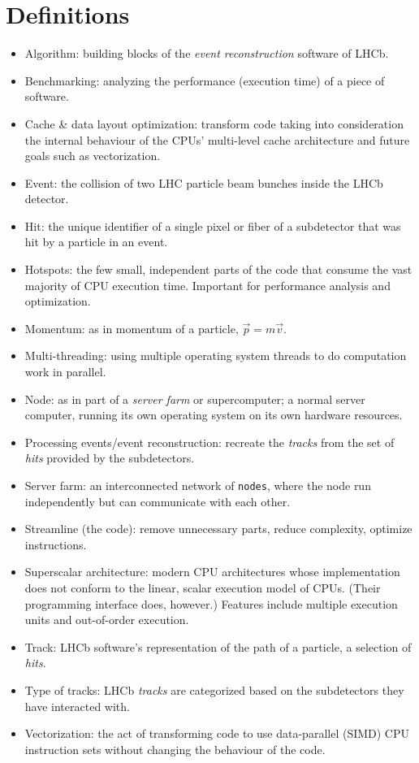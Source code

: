\documentclass[12pt]{article}
\newcommand{\code}[1]{\texttt{#1}}
\begin{document}
\section*{Definitions}

\begin{itemize}
	\item Algorithm: building blocks of the \textit{event reconstruction} software of LHCb.
	\item Benchmarking: analyzing the performance (execution time) of a piece of software.
	\item Cache \& data layout optimization: transform code taking into consideration the internal behaviour of the CPUs' multi-level cache architecture and future goals such as vectorization.
	\item Event: the collision of two LHC particle beam bunches inside the LHCb detector.
	\item Hit: the unique identifier of a single pixel or fiber of a subdetector that was hit by a particle in an event.
	\item Hotspots: the few small, independent parts of the code that consume the vast majority of CPU execution time. Important for performance analysis and optimization.
	\item Momentum: as in momentum of a particle, $\Vec{p}=m\Vec{v}$.
	\item Multi-threading: using multiple operating system threads to do computation work in parallel.
	\item Node: as in part of a \textit{server farm} or supercomputer; a normal server computer, running its own operating system on its own hardware resources.
	\item Processing events/event reconstruction: recreate the \textit{tracks} from the set of \textit{hits} provided by the subdetectors.
	\item Server farm: an interconnected network of \code{nodes}, where the node run independently but can communicate with each other.
	\item Streamline (the code): remove unnecessary parts, reduce complexity, optimize instructions.
	\item Superscalar architecture: modern CPU architectures whose implementation does not conform to the linear, scalar execution model of CPUs. (Their programming interface does, however.) Features include multiple execution units and out-of-order execution.
	\item Track: LHCb software's representation of the path of a particle, a selection of \textit{hits}.
	\item Type of tracks: LHCb \textit{tracks} are categorized based on the subdetectors they have interacted with.
	\item Vectorization: the act of transforming code to use data-parallel (SIMD) CPU instruction sets without changing the behaviour of the code.
\end{itemize}
\end{document}

